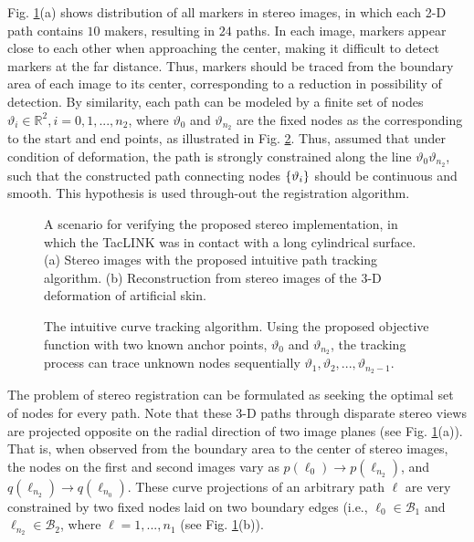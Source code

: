 \documentclass[10pt,letterpaper,journal,final,twoside,twocolumn,nofonttune]{IEEEtran}
\begin{document}
Fig. \ref{fig_performance}(a) shows distribution of all markers in stereo images, in which each 2-D path contains $10$ makers, resulting in $24$ paths. In each image, markers appear close to each other when approaching the center, making it difficult to detect markers at the far distance. Thus, markers should be traced from the boundary area of each image to its center, corresponding to a reduction in possibility of detection. By similarity, each path can be modeled by a finite set of nodes $\vartheta_i \in \mathbb{R}^2, i = 0,1,...,n_2$, where $\vartheta_{0}$ and $\vartheta_{n_2}$ are the fixed nodes as the corresponding to the start and end points, as illustrated in Fig. \ref{fig_tracking}. Thus, assumed that under condition of deformation, the path is strongly constrained along the line $\vartheta_0\vartheta_{n_2}$, such that the constructed path connecting nodes $\set{\vartheta_i}$ should be continuous and smooth. This hypothesis is used through-out the registration algorithm.

\begin{figure}[!t]
\def\svgwidth{\columnwidth}

\caption{A scenario for verifying the proposed stereo implementation, in which the TacLINK was in contact with a long cylindrical surface. (a) Stereo images with the proposed intuitive path tracking algorithm. (b) Reconstruction from stereo images of the 3-D deformation of artificial skin.}
\label{fig_performance}
\end{figure}
\begin{figure}[!t]
\def\svgwidth{\columnwidth}

\caption{The intuitive curve tracking algorithm. Using the proposed objective function with two known anchor points, $\vartheta_0$ and $\vartheta_{n_2}$, the tracking process can trace unknown nodes sequentially $\vartheta_1,\vartheta_2,...,\vartheta_{n_2-1}$.}
\label{fig_tracking}
\end{figure}

The problem of stereo registration can be formulated as seeking the optimal set of nodes for every path. Note that these 3-D paths through disparate stereo views are projected opposite on the radial direction of two image planes (see Fig. \ref{fig_performance}(a)). That is, when observed from the boundary area to the center of stereo images, the nodes on the first and second images vary  as $p(\ell_0) \to p(\ell_{n_2})$, and $q(\ell_{n_2}) \to q(\ell_{n_0})$. These curve projections of an arbitrary path $\ell$ are very constrained by two fixed nodes laid on two boundary edges (i.e., $\ell_0\in \mathcal{B}_1$ and $\ell_{n_2} \in \mathcal{B}_2$, where $\ell=1,...,n_1$ (see Fig. \ref{fig_performance}(b)).
\end{document}
